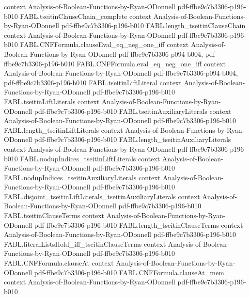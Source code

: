 \begin{theorem}
  {context}
  {Analysis-of-Boolean-Functions-by-Ryan-ODonnell}
  {pdf-ffbe9c7b3306-p196-b010}
\proofstep
  {FABL.tseitinClauseChain_complete}
  {context}
  {Analysis-of-Boolean-Functions-by-Ryan-ODonnell}
  {pdf-ffbe9c7b3306-p196-b010}
\proofstep
  {FABL.length_tseitinClauseChain}
  {context}
  {Analysis-of-Boolean-Functions-by-Ryan-ODonnell}
  {pdf-ffbe9c7b3306-p196-b010}
\proofstep
  {FABL.CNFFormula.clauseEval_eq_neg_one_iff}
  {context}
  {Analysis-of-Boolean-Functions-by-Ryan-ODonnell}
  {pdf-ffbe9c7b3306-p094-b004,
    pdf-ffbe9c7b3306-p196-b010}
\proofstep
  {FABL.CNFFormula.eval_eq_neg_one_iff}
  {context}
  {Analysis-of-Boolean-Functions-by-Ryan-ODonnell}
  {pdf-ffbe9c7b3306-p094-b004,
    pdf-ffbe9c7b3306-p196-b010}
\proofstep
  {FABL.tseitinLiftLiteral}
  {context}
  {Analysis-of-Boolean-Functions-by-Ryan-ODonnell}
  {pdf-ffbe9c7b3306-p196-b010}
\proofstep
  {FABL.tseitinLiftLiterals}
  {context}
  {Analysis-of-Boolean-Functions-by-Ryan-ODonnell}
  {pdf-ffbe9c7b3306-p196-b010}
\proofstep
  {FABL.tseitinAuxiliaryLiterals}
  {context}
  {Analysis-of-Boolean-Functions-by-Ryan-ODonnell}
  {pdf-ffbe9c7b3306-p196-b010}
\proofstep
  {FABL.length_tseitinLiftLiterals}
  {context}
  {Analysis-of-Boolean-Functions-by-Ryan-ODonnell}
  {pdf-ffbe9c7b3306-p196-b010}
\proofstep
  {FABL.length_tseitinAuxiliaryLiterals}
  {context}
  {Analysis-of-Boolean-Functions-by-Ryan-ODonnell}
  {pdf-ffbe9c7b3306-p196-b010}
\proofstep
  {FABL.nodupIndices_tseitinLiftLiterals}
  {context}
  {Analysis-of-Boolean-Functions-by-Ryan-ODonnell}
  {pdf-ffbe9c7b3306-p196-b010}
\proofstep
  {FABL.nodupIndices_tseitinAuxiliaryLiterals}
  {context}
  {Analysis-of-Boolean-Functions-by-Ryan-ODonnell}
  {pdf-ffbe9c7b3306-p196-b010}
\proofstep
  {FABL.disjoint_tseitinLiftLiterals_tseitinAuxiliaryLiterals}
  {context}
  {Analysis-of-Boolean-Functions-by-Ryan-ODonnell}
  {pdf-ffbe9c7b3306-p196-b010}
\proofstep
  {FABL.tseitinClauseTerms}
  {context}
  {Analysis-of-Boolean-Functions-by-Ryan-ODonnell}
  {pdf-ffbe9c7b3306-p196-b010}
\proofstep
  {FABL.length_tseitinClauseTerms}
  {context}
  {Analysis-of-Boolean-Functions-by-Ryan-ODonnell}
  {pdf-ffbe9c7b3306-p196-b010}
\proofstep
  {FABL.literalListsHold_iff_tseitinClauseTerms}
  {context}
  {Analysis-of-Boolean-Functions-by-Ryan-ODonnell}
  {pdf-ffbe9c7b3306-p196-b010}
\proofstep
  {FABL.CNFFormula.clauseAt}
  {context}
  {Analysis-of-Boolean-Functions-by-Ryan-ODonnell}
  {pdf-ffbe9c7b3306-p196-b010}
\proofstep
  {FABL.CNFFormula.clauseAt_mem}
  {context}
  {Analysis-of-Boolean-Functions-by-Ryan-ODonnell}
  {pdf-ffbe9c7b3306-p196-b010}
\proofstep

\end{theorem}
